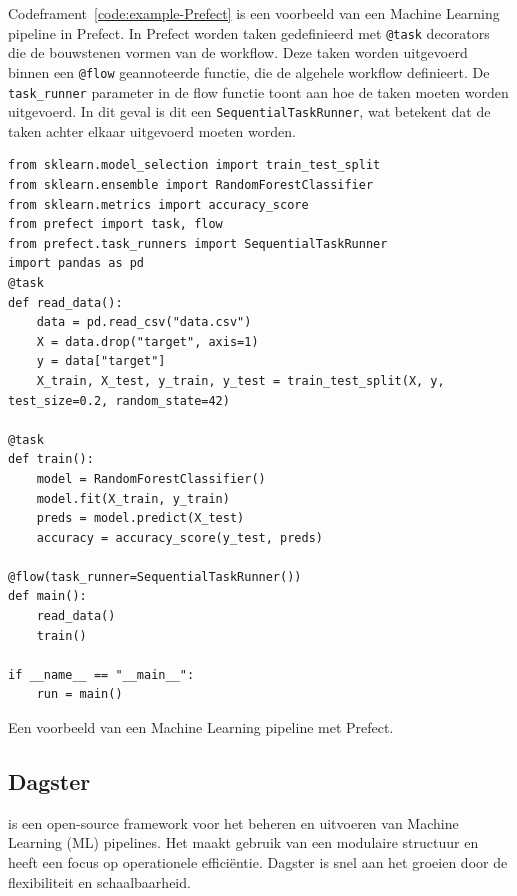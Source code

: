 Codeframent~\ref{code:example-Prefect} is een voorbeeld van een Machine Learning pipeline in Prefect. In Prefect worden taken gedefinieerd met \texttt{@task} decorators die de bouwstenen vormen van de workflow. Deze taken worden uitgevoerd binnen een \texttt{@flow} geannoteerde functie, die de algehele workflow definieert. De \texttt{task\_runner} parameter in de flow functie toont aan hoe de taken moeten worden uitgevoerd. In dit geval is dit een \texttt{SequentialTaskRunner}, wat betekent dat de taken achter elkaar uitgevoerd moeten worden.

\begin{listing}
\begin{verbatim}
from sklearn.model_selection import train_test_split
from sklearn.ensemble import RandomForestClassifier
from sklearn.metrics import accuracy_score
from prefect import task, flow
from prefect.task_runners import SequentialTaskRunner
import pandas as pd
@task
def read_data():
    data = pd.read_csv("data.csv")
    X = data.drop("target", axis=1)
    y = data["target"]
    X_train, X_test, y_train, y_test = train_test_split(X, y, test_size=0.2, random_state=42)

@task    
def train():
    model = RandomForestClassifier()
    model.fit(X_train, y_train)
    preds = model.predict(X_test)
    accuracy = accuracy_score(y_test, preds)

@flow(task_runner=SequentialTaskRunner())
def main():
    read_data()
    train()

if __name__ == "__main__":
    run = main()
\end{verbatim}
\caption[Voorbeeld van een Machine Learning pipeline met Prefect.]{\label{code:example-Prefect}Een voorbeeld van een Machine Learning pipeline met Prefect.}
\end{listing}

\subsection{Dagster}
\textcite{Dagster2024} is een open-source framework voor het beheren en uitvoeren van Machine Learning (ML) pipelines. Het maakt gebruik van een modulaire structuur en heeft een focus op operationele efficiëntie. Dagster is snel aan het groeien door de flexibiliteit en schaalbaarheid.

